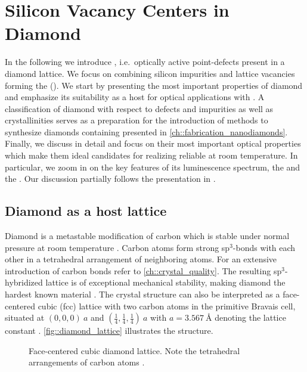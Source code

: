 
\chapter{Silicon Vacancy Centers in Diamond}	\label{ch::sivs}

  In the following we introduce \ccs, i.e.\ optically active point-defects present in a diamond lattice.
  We focus on \ccs combining silicon impurities and lattice vacancies forming the \sivc (\siv).
  We start by presenting the most important properties of diamond and emphasize its suitability as a host for optical applications with \ccs.
  A classification of diamond with respect to defects and impurities as well as crystallinities serves as a preparation for the introduction of methods to synthesize diamonds containing \sivs presented in \autoref{ch::fabrication_nanodiamonds}.
  Finally, we discuss \sivs in detail and focus on their most important optical properties which make them ideal candidates for realizing reliable \spss at room temperature.
  In particular, we zoom in on the key features of its luminescence spectrum, the \zpl and the \psb.
  Our discussion partially follows the presentation in \cite{Riedrich-moller2014, neu2012, BeckerMasterThesis, Steinmetz2011}.

\section{Diamond as a host lattice}

  Diamond is a metastable modification of carbon which is stable under normal pressure at room temperature \cite{Bundy1989}. Carbon atoms form strong sp$^3$-bonds with each other in a tetrahedral arrangement of neighboring atoms. For an extensive introduction of carbon bonds refer to \autoref{ch::crystal_quality}. The resulting sp$^3$-hybridized lattice is of exceptional mechanical stability, making diamond the hardest known material \cite{telling2000theoretical}.
  The crystal structure can also be interpreted as a face-centered cubic (fcc) lattice with two carbon atoms in the primitive Bravais cell, situated at $(0,0,0) \ a$ and $ (\frac{1}{4}, \frac{1}{4}, \frac{1}{4}) \ a$ with $a = \SI{3.567}{\angstrom}$ denoting the lattice constant \cite{Saotome1998}. \autoref{fig::diamond_lattice} illustrates the structure.

  \begin{figure}[htbp]
		\centering
		\caption[Face-centered cubic diamond lattice]{Face-centered cubic diamond lattice. Note the tetrahedral arrangements of carbon atoms \cite{demtroder2000experimentalphysik}.}
		\label{fig::diamond_lattice}
	\end{figure}

